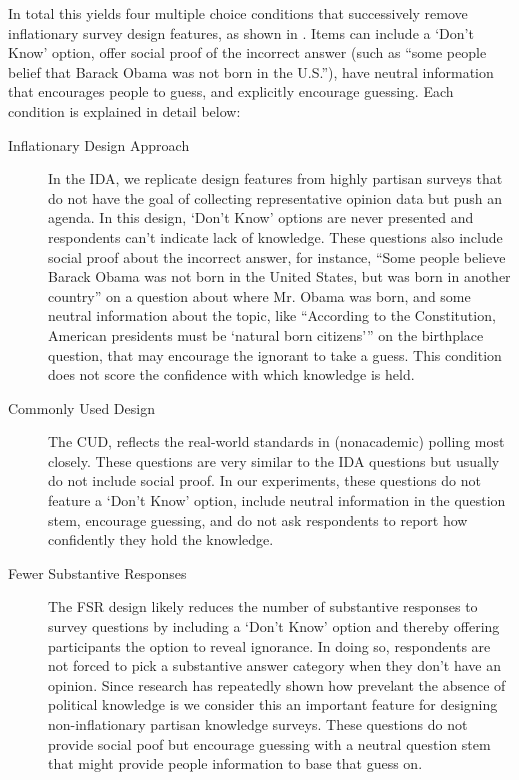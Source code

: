 \documentclass[12pt, letterpaper]{article}
\begin{document}
In total this yields four multiple choice conditions that successively remove inflationary survey design features, as shown in . Items can include a `Don't Know' option, offer social proof of the incorrect answer (such as ``some people belief that Barack Obama was not born in the U.S.''), have neutral information that encourages people to guess, and explicitly encourage guessing. Each condition is explained in detail below:



\begin{description}
  \item[Inflationary Design Approach] \label{txt:IDA} In the IDA, we replicate design features from highly partisan surveys that do not have the goal of collecting representative opinion data but push an agenda. In this design, `Don't Know' options are never presented and respondents can't indicate lack of knowledge. These questions also include social proof  about the incorrect answer, for instance, ``Some people believe Barack Obama was not born in the United States, but was born in another country'' on a question about where Mr. Obama was born, and some neutral information about the topic, like ``According to the Constitution, American presidents must be `natural born citizens''' on the birthplace question, that may encourage the ignorant to take a guess.  This condition does not score the confidence with which knowledge is held.
  \item[Commonly Used Design] \label{txt:CUD} The CUD, reflects the real-world standards in (nonacademic) polling most closely. These questions are very similar to the IDA questions but usually do not include social proof. In our experiments, these questions do not feature a `Don't Know' option, include neutral information in the question stem, encourage guessing, and do not ask respondents to report how confidently they hold the knowledge.
  \item[Fewer Substantive Responses] \label{txt:FSR} The FSR design likely reduces the number of substantive responses to survey questions by including a `Don't Know' option and thereby offering participants the option to reveal ignorance. In doing so, respondents are not forced to pick a substantive answer category when they don't have an opinion. Since research has repeatedly shown how prevelant the absence of political knowledge is we consider this an important feature for designing non-inflationary partisan knowledge surveys. These questions do not provide social poof but encourage guessing with a neutral question stem that might provide people information to base that guess on.

\end{description}
\end{document}
